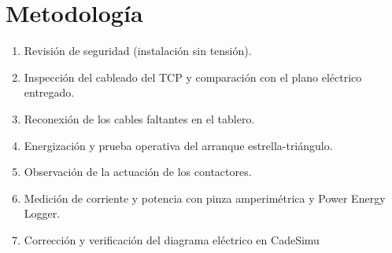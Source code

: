 \section{Metodología}
\begin{enumerate}
    \item Revisión de seguridad (instalación sin tensión).
    \item Inspección del cableado del TCP y comparación con el plano eléctrico entregado.
    \item Reconexión de los cables faltantes en el tablero.
    \item Energización y prueba operativa del arranque estrella-triángulo.
    \item Observación de la actuación de los contactores.
    \item Medición de corriente y potencia con pinza amperimétrica y Power Energy Logger.
    \item Corrección y verificación del diagrama eléctrico en CadeSimu 
\end{enumerate}
